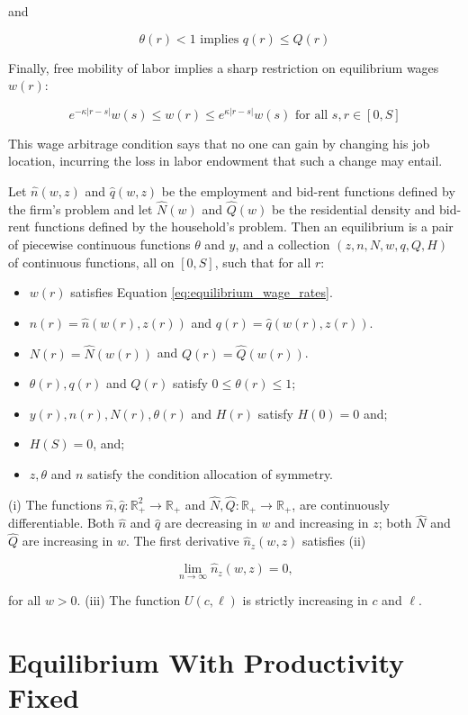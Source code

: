 and

\begin{equation}
    \theta(r) < 1 \text{ implies } q(r) \leq Q(r)
\end{equation}

Finally, free mobility of labor implies a sharp restriction on equilibrium wages $w(r)$:

\begin{equation}
    e^{-\kappa |r - s|} w(s) \leq w(r) \leq e^{\kappa |r- s|} w(s) \text{ for all } s, r \in [0, S] \label{eq:equilibrium_wage_rates}
\end{equation}

This wage arbitrage condition says that no one can gain by changing his job location, incurring the loss in labor endowment that such a change may entail.

\begin{definition}
Let $\hat{n}(w, z)$ and $\hat{q}(w, z)$ be the employment and bid-rent functions defined by the firm's problem and let $\hat{N}(w)$ and $\hat{Q}(w)$ be the residential density and bid-rent functions defined by the household's problem. Then an equilibrium is a pair of piecewise continuous functions $\theta$ and $y$, and a collection $(z, n, N, w, q, Q, H)$ of continuous functions, all on $[0, S]$, such that for all $r$:

\begin{itemize}
\item $w(r)$ satisfies Equation \eqref{eq:equilibrium_wage_rates}.
\item $n(r) = \hat{n}(w(r), z(r))$ and $q(r) = \hat{q}(w(r), z(r))$.
\item $N(r) = \hat{N}(w(r))$ and $Q(r) = \hat{Q}(w(r))$.
\item $\theta(r), q(r)$ and $Q(r)$ satisfy $0 \leq \theta(r) \leq 1$;
\item $y(r), n(r), N(r), \theta(r)$ and $H(r)$ satisfy $H(0) = 0$ and;
\item $H(S) = 0$, and;
\item $z, \theta$ and $n$ satisfy the condition allocation of symmetry.
\end{itemize}
\end{definition}

\begin{assumption}
    (i) The functions $\hat{n}, \hat{q}: \mathbb{R}_+^2 \to \mathbb{R}_+$ and $\hat{N}, \hat{Q}: \mathbb{R}_+ \to \mathbb{R}_+$, are continuously differentiable. Both $\hat{n}$ and $\hat{q}$ are decreasing in $w$ and increasing in $z$; both $\hat{N}$ and $\hat{Q}$ are increasing in $w$. The first derivative $\hat{n}_z(w, z)$ satisfies (ii)

    \begin{equation*}
        \lim_{n \to \infty} \hat{n}_z(w, z) = 0,
    \end{equation*}

    for all $w > 0$. (iii) The function $U(c, \ell)$ is strictly increasing in $c$ and $\ell$.
\end{assumption}

\section{Equilibrium With Productivity Fixed}